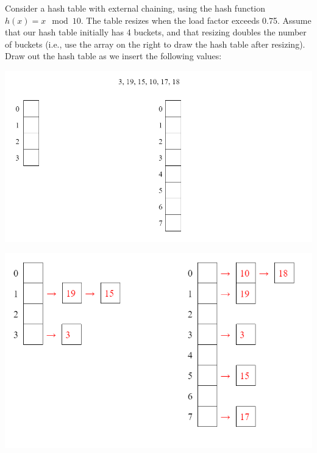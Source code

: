 \question Consider a hash table with external chaining, using the hash function $h(x) = x \mod 10$. The table resizes when the load factor exceeds 0.75. Assume that our hash table initially has 4 buckets, and that resizing doubles the number of buckets (i.e., use the array on the right to draw the hash table after resizing). Draw out the hash table as we insert the following values:

\includegraphics[scale=0.96]{topics/hashing/MockMidterm/hashing_mockmt_q1.PNG}

\begin{solution}
\includegraphics[scale=1]{topics/hashing/MockMidterm/hashing_mockmt_q1_sol.PNG}
\end{solution}
